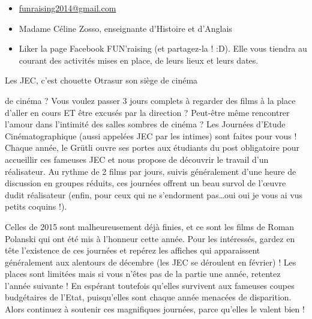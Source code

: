 \begin{article}
\begin{spacing}{1.05}

\vspace*{-2\baselineskip}\begin{itemize}[leftmargin=0cm,itemindent=.5cm]
	\item \url{funraising2014@gmail.com}
	\item Madame Céline Zosso, enseignante d’Histoire et d’Anglais
	\item Liker la page Facebook FUN’raising (et partagez-la ! :D). Elle vous tiendra au courant des activités mises en place, de leurs lieux et leurs dates.
\end{itemize}
\end{spacing}
\end{article}



\ligne


\begin{article}
{Les JEC, c'est chouette}
{Otra}{sur son siège de cinéma}

\begin{spacing}{1.06}
 de cinéma ? Vous voulez passer 3 jours complets à regarder des films à la place d’aller en cours ET être excusés par la direction ? Peut-être même rencontrer l’amour dans l’intimité des salles sombres de cinéma ? Les Journées d’Etude Cinématographique (aussi appelées JEC par les intimes) sont faites pour vous ! Chaque année, le Grütli ouvre ses portes aux étudiants du post obligatoire pour accueillir ces fameuses JEC et nous propose de découvrir le travail d’un réalisateur. Au rythme de 2 films par jours, suivis généralement d’une heure de discussion en groupes réduits, ces journées offrent un beau survol de l’œuvre dudit réalisateur (enfin, pour ceux qui ne s’endorment pas…oui oui je vous ai vus petits coquins !).

Celles de 2015 sont malheureusement déjà finies, et ce sont les films de Roman Polanski qui ont été mis à l’honneur cette année. Pour les intéressés, gardez en tête l’existence de ces journées et repérez les affiches qui apparaissent généralement aux alentours de décembre (les JEC se déroulent en février) ! Les places sont limitées mais si vous n’êtes pas de la partie une année, retentez l’année suivante ! En espérant toutefois qu’elles survivent aux fameuses coupes budgétaires de l’Etat, puisqu’elles sont chaque année menacées de disparition. Alors continuez à soutenir ces magnifiques journées, parce qu’elles le valent bien !
\end{spacing}
\end{article}


